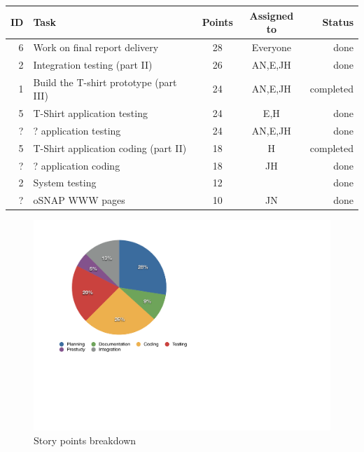 \begin{table}[ht!]
\begin{tabular}{ | r | l | c | c | r | }

\hline
\textbf{ID} & \textbf{Task} & \textbf{Points} & \textbf{Assigned to} & \textbf{Status} \\
\hline

 6 & Work on final report delivery				& 28 & Everyone	& done \\
\hline
 2 & Integration testing (part II)				& 26 & AN,E,JH	& done \\
\hline
 1 & Build the T-shirt prototype (part III)	& 24 & AN,E,JH	& completed \\
\hline
 5 & T-Shirt application testing 				& 24 & E,H		& done \\
\hline
 ? & ? application testing						& 24 & AN,E,JH	& done \\
\hline
 5 & T-Shirt application coding (part II)		& 18 & H		& completed \\
\hline
 ? & ? application coding						& 18 & JH		& done \\
\hline
 2 & System testing								& 12 &			& done \\
\hline
 ? & oSNAP WWW pages							& 10 & JN		& done \\
\hline

\end{tabular}
\end{table}

\newpage

\begin{figure}[h!]
\centering \includegraphics[scale=0.8]{img/pie_chart.pdf}
\caption{Story points breakdown}
\label{fig:sprints-points}
\end{figure}
